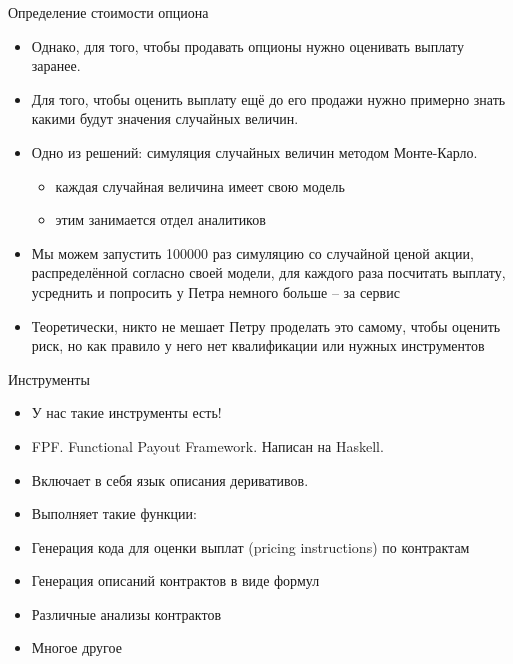 \documentclass{beamer}
\begin{document}
\begin{frame}{Определение стоимости опциона}

\begin{itemize}
\item
  Однако, для того, чтобы продавать опционы нужно оценивать выплату
  заранее.
\item
  Для того, чтобы оценить выплату ещё до его продажи нужно примерно
  знать какими будут значения случайных величин.
\item
  Одно из решений: симуляция случайных величин методом Монте-Карло.

  \begin{itemize}
  \item
    каждая случайная величина имеет свою модель
  \item
    этим занимается отдел аналитиков
  \end{itemize}
\item
  Мы можем запустить 100000 раз симуляцию со случайной ценой акции,
  распределённой согласно своей модели, для каждого раза посчитать
  выплату, усреднить и попросить у Петра немного больше -- за сервис
\item
  Теоретически, никто не мешает Петру проделать это самому, чтобы
  оценить риск, но как правило у него нет квалификации или нужных
  инструментов
\end{itemize}
\end{frame}\begin{frame}{Инструменты}

\begin{itemize}
\item
  У нас такие инструменты есть!
\item
  FPF. Functional Payout Framework. Написан на Haskell.
\item
  Включает в себя язык описания деривативов.
\item
  Выполняет такие функции:
\item
  Генерация кода для оценки выплат (pricing instructions) по контрактам
\item
  Генерация описаний контрактов в виде формул
\item
  Различные анализы контрактов
\item
  Многое другое
\end{itemize}
\end{frame}
\end{document}
